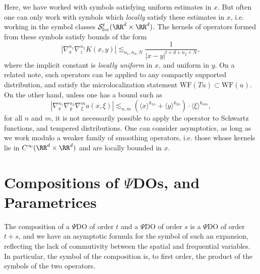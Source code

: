 \begin{remark}
    Here, we have worked with symbols satisfying uniform estimates in $x$. But often one can only work with symbols which \emph{locally} satisfy these estimates in $x$, i.e. working in the symbol classes $\mathcal{S}^t_{\text{loc}}(\RR^d \times \RR^d)$. The kernels of operators formed from these symbols satisfy bounds of the form
    \[ | \nabla^{n_1}_x \nabla^{n_2}_z K(x,y)| \lesssim_{n_1,n_2,N} \frac{1}{|x-y|^{t + d + n_2 + N}}, \]
    where the implicit constant is \emph{locally uniform} in $x$, and uniform in $y$. On a related note, such operators can be applied to any compactly supported distribution, and satisfy the microlocalization statement $\text{WF}(Tu) \subset \text{WF}(u)$. On the other hand, unless one has a bound such as
    \[ |\nabla_x^{n_1} \nabla_y^{n_2} \nabla_\xi^m a(x,\xi)| \lesssim_{n,m} (\langle x \rangle^{k_{1n}} + \langle y \rangle^{k_{2n}}) \cdot \langle \xi \rangle^{k_{nm}}, \]
    for all $n$ and $m$, it is not necessarily possible to apply the operator to Schwartz functions, and tempered distributions. One can consider asymptotics, as long as we work modulo a weaker family of smoothing operators, i.e. those whose kernels lie in $C^\infty(\RR^d \times \RR^d)$ and are locally bounded in $x$.
\end{remark}

\section{Compositions of $\Psi$DOs, and Parametrices}

The composition of a $\Psi$DO of order $t$ and a $\Psi$DO of order $s$ is a $\Psi$DO of order $t + s$, and we have an asymptotic formula for the symbol of such an expansion, reflecting the lack of commutivity between the spatial and frequential variables. In particular, the symbol of the composition is, to first order, the product of the symbols of the two operators.


